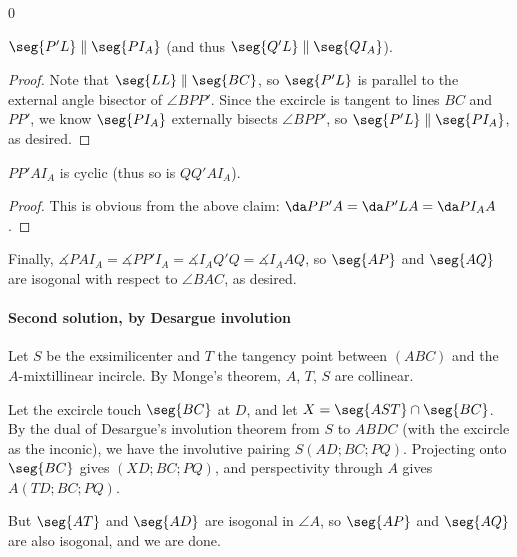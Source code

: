 \setcounter{claim}0
\begin{claim}
    $\seg{P'L}\parallel\seg{PI_A}$ (and thus $\seg{Q'L}\parallel\seg{QI_A}$).
\end{claim}
\begin{proof}
    Note that $\seg{LL}\parallel\seg{BC}$, so $\seg{P'L}$ is parallel to the external angle bisector of $\angle BPP'$. Since the excircle is tangent to lines $BC$ and $PP'$, we know $\seg{PI_A}$ externally bisects $\angle BPP'$, so $\seg{P'L}\parallel\seg{PI_A}$, as desired.
\end{proof}
\begin{claim}
    $PP'AI_A$ is cyclic (thus so is $QQ'AI_A$).
\end{claim}
\begin{proof}
    This is obvious from the above claim: $\da PP'A=\da P'LA=\da PI_AA$.
\end{proof}

Finally, $\measuredangle PAI_A=\measuredangle PP'I_A=\measuredangle I_AQ'Q=\measuredangle I_AAQ$, so $\seg{AP}$ and $\seg{AQ}$ are isogonal with respect to $\angle BAC$, as desired.

\paragraph{Second solution, by Desargue involution}     Let $S$ be the exsimilicenter and $T$ the tangency point between $(ABC)$ and the $A$-mixtillinear incircle. By Monge's theorem, $A$, $T$, $S$ are collinear.

Let the excircle touch $\seg{BC}$ at $D$, and let $X=\seg{AST}\cap\seg{BC}$. By the dual of Desargue's involution theorem from $S$ to $ABDC$ (with the excircle as the inconic), we have the involutive pairing $S(AD;BC;PQ)$. Projecting onto $\seg{BC}$ gives $(XD;BC;PQ)$, and perspectivity through $A$ gives $A(TD;BC;PQ)$.

But $\seg{AT}$ and $\seg{AD}$ are isogonal in $\angle A$, so $\seg{AP}$ and $\seg{AQ}$ are also isogonal, and we are done.


